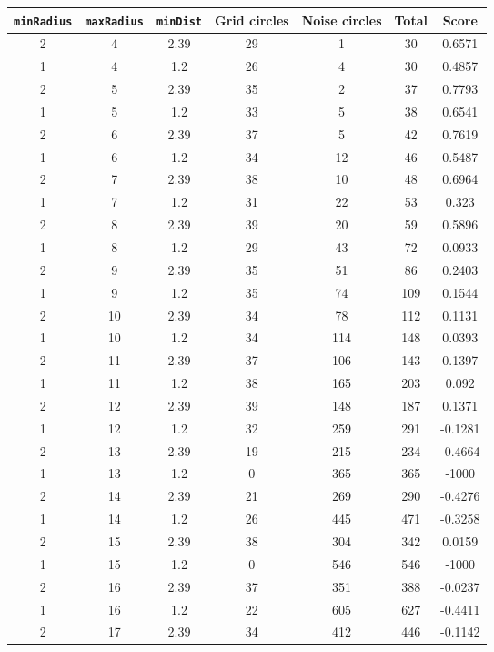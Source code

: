 \documentclass[letterpaper, 12pt]{article}
\begin{document}
\begin{longtable}{|c|c|c|c|c|c|c|}
\hline
\textbf{\texttt{minRadius}} & \textbf{\texttt{maxRadius}} & \textbf{\texttt{minDist}} & \textbf{Grid circles} & \textbf{Noise circles} & \textbf{Total} & \textbf{Score} \\
\hline
2 & 4 & 2.39 & 29 & 1 & 30 & 0.6571 \\
\hline
1 & 4 & 1.2 & 26 & 4 & 30 & 0.4857 \\
\hline
2 & 5 & 2.39 & 35 & 2 & 37 & 0.7793 \\
\hline
1 & 5 & 1.2 & 33 & 5 & 38 & 0.6541 \\
\hline
2 & 6 & 2.39 & 37 & 5 & 42 & 0.7619 \\
\hline
1 & 6 & 1.2 & 34 & 12 & 46 & 0.5487 \\
\hline
2 & 7 & 2.39 & 38 & 10 & 48 & 0.6964 \\
\hline
1 & 7 & 1.2 & 31 & 22 & 53 & 0.323 \\
\hline
2 & 8 & 2.39 & 39 & 20 & 59 & 0.5896 \\
\hline
1 & 8 & 1.2 & 29 & 43 & 72 & 0.0933 \\
\hline
2 & 9 & 2.39 & 35 & 51 & 86 & 0.2403 \\
\hline
1 & 9 & 1.2 & 35 & 74 & 109 & 0.1544 \\
\hline
2 & 10 & 2.39 & 34 & 78 & 112 & 0.1131 \\
\hline
1 & 10 & 1.2 & 34 & 114 & 148 & 0.0393 \\
\hline
2 & 11 & 2.39 & 37 & 106 & 143 & 0.1397 \\
\hline
1 & 11 & 1.2 & 38 & 165 & 203 & 0.092 \\
\hline
2 & 12 & 2.39 & 39 & 148 & 187 & 0.1371 \\
\hline
1 & 12 & 1.2 & 32 & 259 & 291 & -0.1281 \\
\hline
2 & 13 & 2.39 & 19 & 215 & 234 & -0.4664 \\
\hline
1 & 13 & 1.2 & 0 & 365 & 365 & -1000 \\
\hline
2 & 14 & 2.39 & 21 & 269 & 290 & -0.4276 \\
\hline
1 & 14 & 1.2 & 26 & 445 & 471 & -0.3258 \\
\hline
2 & 15 & 2.39 & 38 & 304 & 342 & 0.0159 \\
\hline
1 & 15 & 1.2 & 0 & 546 & 546 & -1000 \\
\hline
2 & 16 & 2.39 & 37 & 351 & 388 & -0.0237 \\
\hline
1 & 16 & 1.2 & 22 & 605 & 627 & -0.4411 \\
\hline
2 & 17 & 2.39 & 34 & 412 & 446 & -0.1142 \\

\end{longtable}
\end{document}
